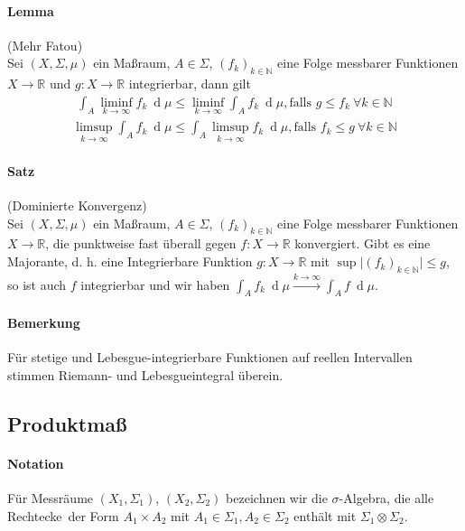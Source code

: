 \documentclass[12pt,a4paper,fleqn]{article}
\def\d{{\operatorname{d}}}
\begin{document}
\paragraph{Lemma} (Mehr Fatou)\\
Sei $(X, \Sigma, \mu)$ ein Maßraum, $A \in \Sigma$, $(f_k)_{k \in \mathbb{N}}$ eine Folge messbarer Funktionen $X \rightarrow \mathbb{R}$ und $g\colon X \rightarrow \mathbb{R}$ integrierbar, dann gilt
\begin{align*}
\int_A \liminf_{k \rightarrow\infty} f_k\ \d\mu \leq \liminf_{k \rightarrow \infty} \int_A f_k\ \d\mu, \text{falls } g \leq f_k\ \forall k \in \mathbb{N}
\end{align*}
\begin{align*}
\limsup_{k \rightarrow \infty} \int_A f_k\ \d\mu \leq \int_A \limsup_{k \rightarrow \infty} f_k\ \d\mu, \text{falls } f_k \leq g\ \forall k \in \mathbb{N}
\end{align*}

\paragraph{Satz} (Dominierte Konvergenz)\\
Sei $(X, \Sigma, \mu)$ ein Maßraum, $A \in \Sigma$, $(f_k)_{k \in \mathbb{N}}$ eine Folge messbarer Funktionen $X \rightarrow \mathbb{R}$, die punktweise fast überall gegen $f\colon X \rightarrow \mathbb{R}$ konvergiert. Gibt es eine Majorante, d. h. eine Integrierbare Funktion $g\colon X \rightarrow \mathbb{R}$ mit $\sup \vert (f_k)_{k \in \mathbb{N}} \vert \leq g$, so ist auch $f$ integrierbar und wir haben $\int_A f_k\ \d\mu \xrightarrow{k \rightarrow \infty} \int_A f\ \d\mu$.

\paragraph{Bemerkung} Für stetige und Lebesgue-integrierbare Funktionen auf reellen Intervallen stimmen Riemann- und Lebesgueintegral überein.

\subsection{Produktmaß}

\paragraph{Notation} Für Messräume $(X_1, \Sigma_1)$, $(X_2, \Sigma_2)$ bezeichnen wir die $\sigma$-Algebra, die alle \glqq Rechtecke\grqq\ der Form $A_1 \times A_2$ mit $A_1 \in \Sigma_1, A_2 \in \Sigma_2$ enthält mit $\Sigma_1 \otimes \Sigma_2$.
\end{document}
